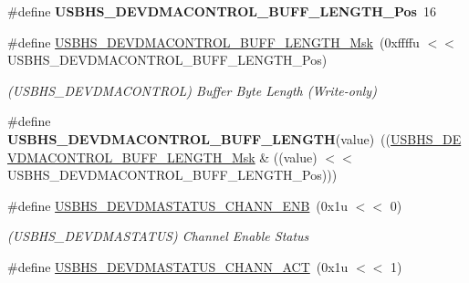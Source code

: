 \begin{DoxyCompactItemize}
\mbox{\label{group__SAME70__USBHS_gaad173b16d3590fafce3d5e59024be02c}} 
\#define {\bfseries U\+S\+B\+H\+S\+\_\+\+D\+E\+V\+D\+M\+A\+C\+O\+N\+T\+R\+O\+L\+\_\+\+B\+U\+F\+F\+\_\+\+L\+E\+N\+G\+T\+H\+\_\+\+Pos}~16
\item 
\mbox{\label{group__SAME70__USBHS_gab7cc3056aeb7d9b49c34b00988756993}} 
\#define \mbox{\hyperlink{group__SAME70__USBHS_gab7cc3056aeb7d9b49c34b00988756993}{U\+S\+B\+H\+S\+\_\+\+D\+E\+V\+D\+M\+A\+C\+O\+N\+T\+R\+O\+L\+\_\+\+B\+U\+F\+F\+\_\+\+L\+E\+N\+G\+T\+H\+\_\+\+Msk}}~(0xffffu $<$$<$ U\+S\+B\+H\+S\+\_\+\+D\+E\+V\+D\+M\+A\+C\+O\+N\+T\+R\+O\+L\+\_\+\+B\+U\+F\+F\+\_\+\+L\+E\+N\+G\+T\+H\+\_\+\+Pos)
\begin{DoxyCompactList}\small\item\em (U\+S\+B\+H\+S\+\_\+\+D\+E\+V\+D\+M\+A\+C\+O\+N\+T\+R\+OL) Buffer Byte Length (Write-\/only) \end{DoxyCompactList}\item 
\mbox{\label{group__SAME70__USBHS_gaeeee9e744d9b3b4e0d05fdee54fa1ba3}} 
\#define {\bfseries U\+S\+B\+H\+S\+\_\+\+D\+E\+V\+D\+M\+A\+C\+O\+N\+T\+R\+O\+L\+\_\+\+B\+U\+F\+F\+\_\+\+L\+E\+N\+G\+TH}(value)~((\mbox{\hyperlink{group__SAMV71__USBHS_gab7cc3056aeb7d9b49c34b00988756993}{U\+S\+B\+H\+S\+\_\+\+D\+E\+V\+D\+M\+A\+C\+O\+N\+T\+R\+O\+L\+\_\+\+B\+U\+F\+F\+\_\+\+L\+E\+N\+G\+T\+H\+\_\+\+Msk}} \& ((value) $<$$<$ U\+S\+B\+H\+S\+\_\+\+D\+E\+V\+D\+M\+A\+C\+O\+N\+T\+R\+O\+L\+\_\+\+B\+U\+F\+F\+\_\+\+L\+E\+N\+G\+T\+H\+\_\+\+Pos)))
\item 
\mbox{\label{group__SAME70__USBHS_ga4102378a0925234238961d88caa949b1}} 
\#define \mbox{\hyperlink{group__SAME70__USBHS_ga4102378a0925234238961d88caa949b1}{U\+S\+B\+H\+S\+\_\+\+D\+E\+V\+D\+M\+A\+S\+T\+A\+T\+U\+S\+\_\+\+C\+H\+A\+N\+N\+\_\+\+E\+NB}}~(0x1u $<$$<$ 0)
\begin{DoxyCompactList}\small\item\em (U\+S\+B\+H\+S\+\_\+\+D\+E\+V\+D\+M\+A\+S\+T\+A\+T\+US) Channel Enable Status \end{DoxyCompactList}\item 
\mbox{\label{group__SAME70__USBHS_ga982a52b634020ac48449b7a15532abcc}} 
\#define \mbox{\hyperlink{group__SAME70__USBHS_ga982a52b634020ac48449b7a15532abcc}{U\+S\+B\+H\+S\+\_\+\+D\+E\+V\+D\+M\+A\+S\+T\+A\+T\+U\+S\+\_\+\+C\+H\+A\+N\+N\+\_\+\+A\+CT}}~(0x1u $<$$<$ 1)

\end{DoxyCompactItemize}
